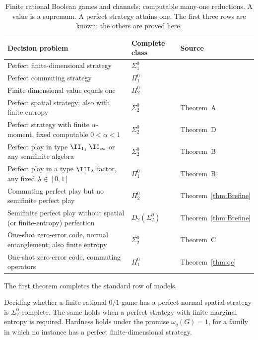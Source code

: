 \begin{table}[ht]
\centering\small
\begin{tabular}{@{}p{.58\linewidth}lp{.17\linewidth}@{}}
\toprule
Decision problem & Complete class & Source\\
\midrule
Perfect finite-dimensional strategy & $\Sigma^0_1$ & \cite{MIPRE}\\
Perfect commuting strategy & $\Pi^0_1$ & \cite{Slofstra,MNY}\\
Finite-dimensional value equals one & $\Pi^0_2$ & \cite{MNY20,MNY}\\
\addlinespace
Perfect spatial strategy; also with finite entropy & $\Sigma^0_2$ & Theorem~A\\
Perfect strategy with finite $\alpha$-moment, fixed computable $0<\alpha<1$ & $\Sigma^0_2$ & Theorem~D\\
Perfect play in type $\II_1$, $\II_\infty$ or any semifinite algebra & $\Sigma^0_2$ & Theorem~B\\
Perfect play in a type $\III_\lambda$ factor, any fixed $\lambda\in[0,1]$ & $\Pi^0_1$ & Theorem~B\\
Commuting perfect play but no semifinite perfect play & $\Pi^0_2$ & Theorem~\ref{thm:Brefine}\\
Semifinite perfect play without spatial (or finite-entropy) perfection & $D_2(\Sigma^0_2)$ & Theorem~\ref{thm:Brefine}\\
\addlinespace
One-shot zero-error code, normal entanglement; also finite entropy & $\Sigma^0_2$ & Theorem~C\\
One-shot zero-error code, commuting operators & $\Pi^0_1$ & Theorem~\ref{thm:qc}\\
\bottomrule
\end{tabular}
\caption{Finite rational Boolean games and channels; computable many-one reductions. A value is a supremum. A perfect strategy attains one. The first three rows are known; the others are proved here.}\label{tab:landscape}
\end{table}

The first theorem completes the standard row of models.

\begin{theoremA}\label{thm:A}
Deciding whether a finite rational $0/1$ game has a perfect normal spatial strategy is $\Sigma^0_2$-complete. The same holds when a perfect strategy with finite marginal entropy is required. Hardness holds under the promise $\omega_q(G)=1$, for a family in which no instance has a perfect finite-dimensional strategy.
\end{theoremA}


